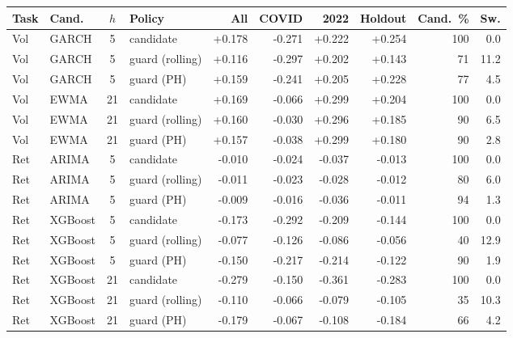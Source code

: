 \begin{tabular}{llclrrrrrr}
\toprule
Task & Cand. & $h$ & Policy & All & COVID & 2022 & Holdout & Cand.\ \% & Sw. \\
\midrule
Vol & GARCH & 5 & candidate & +0.178 & -0.271 & +0.222 & +0.254 & 100 & 0.0 \\
Vol & GARCH & 5 & guard (rolling) & +0.116 & -0.297 & +0.202 & +0.143 & 71 & 11.2 \\
Vol & GARCH & 5 & guard (PH) & +0.159 & -0.241 & +0.205 & +0.228 & 77 & 4.5 \\
Vol & EWMA & 21 & candidate & +0.169 & -0.066 & +0.299 & +0.204 & 100 & 0.0 \\
Vol & EWMA & 21 & guard (rolling) & +0.160 & -0.030 & +0.296 & +0.185 & 90 & 6.5 \\
Vol & EWMA & 21 & guard (PH) & +0.157 & -0.038 & +0.299 & +0.180 & 90 & 2.8 \\
Ret & ARIMA & 5 & candidate & -0.010 & -0.024 & -0.037 & -0.013 & 100 & 0.0 \\
Ret & ARIMA & 5 & guard (rolling) & -0.011 & -0.023 & -0.028 & -0.012 & 80 & 6.0 \\
Ret & ARIMA & 5 & guard (PH) & -0.009 & -0.016 & -0.036 & -0.011 & 94 & 1.3 \\
Ret & XGBoost & 5 & candidate & -0.173 & -0.292 & -0.209 & -0.144 & 100 & 0.0 \\
Ret & XGBoost & 5 & guard (rolling) & -0.077 & -0.126 & -0.086 & -0.056 & 40 & 12.9 \\
Ret & XGBoost & 5 & guard (PH) & -0.150 & -0.217 & -0.214 & -0.122 & 90 & 1.9 \\
Ret & XGBoost & 21 & candidate & -0.279 & -0.150 & -0.361 & -0.283 & 100 & 0.0 \\
Ret & XGBoost & 21 & guard (rolling) & -0.110 & -0.066 & -0.079 & -0.105 & 35 & 10.3 \\
Ret & XGBoost & 21 & guard (PH) & -0.179 & -0.067 & -0.108 & -0.184 & 66 & 4.2 \\
\bottomrule
\end{tabular}
